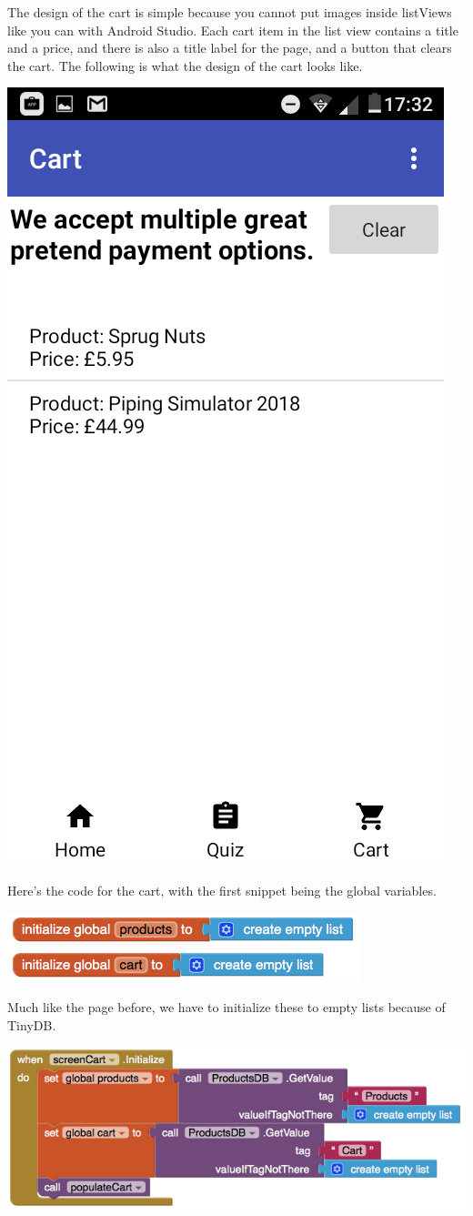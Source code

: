 \documentclass{scrreprt}
\begin{document}
The design of the cart is simple because you cannot put images inside listViews like you can with Android Studio. Each cart item in the list view contains a title and a price, and there is also a title label for the page, and a button that clears the cart. The following is what the design of the cart looks like.

\begin{center}
    \includegraphics[width=0.5\linewidth]{images/cartDesign.png}
\end{center}

Here's the code for the cart, with the first snippet being the global variables.

\begin{center}
    \includegraphics[width=0.75\linewidth]{images/cartGlobal.png}
\end{center}

Much like the page before, we have to initialize these to empty lists because of TinyDB.

\begin{center}
    \includegraphics[width=0.9\linewidth]{images/cartInit.png}
\end{center}
\end{document}
